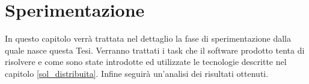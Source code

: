 \chapter{Sperimentazione}  \label{sperimentazione}
In questo capitolo verrà trattata nel dettaglio la fase di sperimentazione dalla quale nasce questa Tesi. Verranno trattati i task che il software prodotto tenta di risolvere e come sono state introdotte ed utilizzate le tecnologie descritte nel capitolo \ref{sol_distribuita}. Infine seguirà un'analisi dei risultati ottenuti.

\clearpage

\newpage

\newpage
